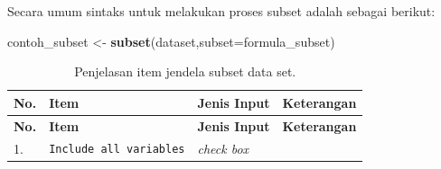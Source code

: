 \documentclass[12pt,]{krantz}
\newenvironment{Shaded}{\begin{snugshade}}{\end{snugshade}}
\newcommand{\DataTypeTok}[1]{\textcolor[rgb]{0.13,0.29,0.53}{#1}}
\newcommand{\KeywordTok}[1]{\textcolor[rgb]{0.13,0.29,0.53}{\textbf{#1}}}
\newcommand{\NormalTok}[1]{#1}
\newcommand{\StringTok}[1]{\textcolor[rgb]{0.31,0.60,0.02}{#1}}
\begin{document}
Secara umum sintaks untuk melakukan proses subset adalah sebagai berikut:

\begin{Shaded}
\begin{Highlighting}[]
\NormalTok{contoh_subset <-}\StringTok{ }\KeywordTok{subset}\NormalTok{(dataset,}\DataTypeTok{subset=}\NormalTok{formula_subset)}
\end{Highlighting}
\end{Shaded}

\begin{longtable}[]{@{}llll@{}}
\caption{\label{tab:subset} Penjelasan item jendela subset data set.}\tabularnewline
\toprule
\begin{minipage}[b]{0.04\columnwidth}\raggedright
\textbf{No.}\strut
\end{minipage} & \begin{minipage}[b]{0.14\columnwidth}\raggedright
\textbf{Item}\strut
\end{minipage} & \begin{minipage}[b]{0.09\columnwidth}\raggedright
\textbf{Jenis Input}\strut
\end{minipage} & \begin{minipage}[b]{0.61\columnwidth}\raggedright
\textbf{Keterangan}\strut
\end{minipage}\tabularnewline
\midrule
\endfirsthead
\toprule
\begin{minipage}[b]{0.04\columnwidth}\raggedright
\textbf{No.}\strut
\end{minipage} & \begin{minipage}[b]{0.14\columnwidth}\raggedright
\textbf{Item}\strut
\end{minipage} & \begin{minipage}[b]{0.09\columnwidth}\raggedright
\textbf{Jenis Input}\strut
\end{minipage} & \begin{minipage}[b]{0.61\columnwidth}\raggedright
\textbf{Keterangan}\strut
\end{minipage}\tabularnewline
\midrule
\endhead
\begin{minipage}[t]{0.04\columnwidth}\raggedright
1.\strut
\end{minipage} & \begin{minipage}[t]{0.14\columnwidth}\raggedright
\texttt{Include\ all\ variables}\strut
\end{minipage} & \begin{minipage}[t]{0.09\columnwidth}\raggedright
\emph{check box}\strut
\end{minipage} & \begin{minipage}[t]{0.61\columnwidth}\raggedright

\end{minipage}
\end{longtable}
\end{document}
